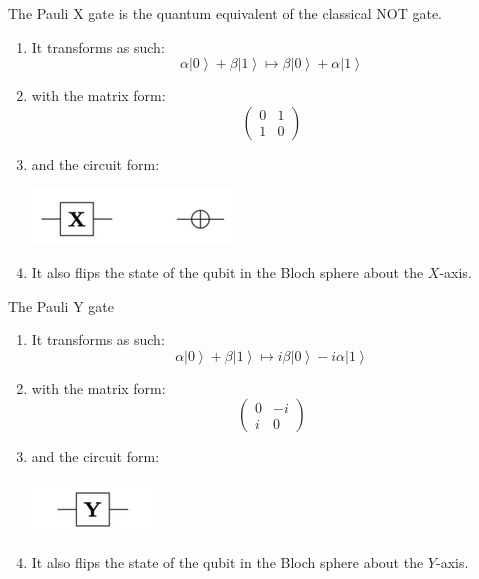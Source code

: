 \documentclass{article}
\newcommand{\ket}[1]{\ensuremath{\left|#1\right\rangle}}
\begin{document}
    \begin{definition}[Pauli X]
      The Pauli X gate is the quantum equivalent of the classical NOT gate. 
      \begin{enumerate} 
        \item It transforms as such: 
          \begin{equation} 
            \alpha \ket{0} + \beta \ket{1} \mapsto \beta \ket{0} + \alpha \ket{1}
          \end{equation}
        \item with the matrix form: 
          \begin{equation} 
            \begin{pmatrix} 0 & 1 \\ 1 & 0 \end{pmatrix}
          \end{equation}
        \item and the circuit form: 
          \begin{center}
            \includegraphics[scale=0.5]{img/Pauli_X_gate.png}
          \end{center}
        \item It also flips the state of the qubit in the Bloch sphere about the $X$-axis. 
      \end{enumerate}
    \end{definition}

    \begin{definition}[Pauli Y]
      The Pauli Y gate 
      \begin{enumerate} 
        \item It transforms as such: 
          \begin{equation} 
            \alpha \ket{0} + \beta \ket{1} \mapsto  i \beta \ket{0} - i \alpha \ket{1}
          \end{equation}
        \item with the matrix form: 
          \begin{equation} 
            \begin{pmatrix} 0 & -i \\ i & 0 \end{pmatrix}
          \end{equation}
        \item and the circuit form: 
          \begin{center}
            \includegraphics[scale=0.5]{img/Pauli_Y_gate.png}
          \end{center}
        \item It also flips the state of the qubit in the Bloch sphere about the $Y$-axis. 
      \end{enumerate}
    \end{definition}
\end{document}
